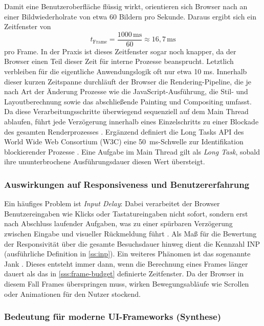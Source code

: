 Damit eine Benutzeroberfläche flüssig wirkt, orientieren sich Browser nach \cite{web.dev_rendering_2023} an einer Bildwiederholrate von etwa 60 Bildern pro Sekunde. Daraus ergibt sich ein Zeitfenster von
\begin{equation}
	t_{\text{Frame}} = \frac{1000\,\mathrm{ms}}{60} \approx 16{,}7\,\mathrm{ms}
\end{equation}
pro Frame.
In der Praxis ist dieses Zeitfenster sogar noch knapper, da der Browser einen Teil dieser Zeit für interne Prozesse beansprucht. Letztlich verbleiben für die eigentliche Anwendungslogik oft nur etwa 10 ms. Innerhalb dieser kurzen Zeitspanne durchläuft der Browser die Rendering-Pipeline, die je nach Art der Änderung Prozesse wie die JavaScript-Ausführung, die Stil- und Layoutberechnung sowie das abschließende Painting und Compositing umfasst. Da diese Verarbeitungsschritte überwiegend sequenziell auf dem Main Thread ablaufen, führt jede Verzögerung innerhalb eines Einzelschritts zu einer Blockade des gesamten Renderprozesses \cite{mdn_mthread_2025}. Ergänzend definiert die Long Tasks API des World Wide Web Consortium (W3C) eine \qty{50}{ms}-Schwelle zur Identifikation blockierender Prozesse \cite{w3c_longtasks_2026}. Eine Aufgabe im Main Thread gilt als \textit{Long Task}, sobald ihre ununterbrochene Ausführungsdauer diesen Wert übersteigt.

\subsubsection{Auswirkungen auf Responsiveness und Benutzererfahrung}
\label{sss:user-expirience}

Ein häufiges Problem ist \textit{Input Delay}: Dabei verarbeitet der Browser Benutzereingaben wie Klicks oder Tastatureingaben nicht sofort, sondern erst nach Abschluss laufender Aufgaben, was zu einer spürbaren Verzögerung zwischen Eingabe und visueller Rückmeldung führt \cite{web.dev_inp_2025, w3c_longtasks_2026}. Als Maß für die Bewertung der Responsivität über die gesamte Besuchsdauer hinweg dient die Kennzahl INP (ausführliche Definition in \cref{ss:inp}). Ein weiteres Phänomen ist das sogenannte Jank \cite{web.dev_rendering_2023}. Dieses entsteht immer dann, wenn die Berechnung eines Frames länger dauert als das in \cref{sss:frame-budget} definierte Zeitfenster. Da der Browser in diesem Fall Frames überspringen muss, wirken Bewegungsabläufe wie Scrollen oder Animationen für den Nutzer stockend.

\subsubsection{Bedeutung für moderne UI-Frameworks (Synthese)}
\label{sss:ui-frameworks-synthesis}

